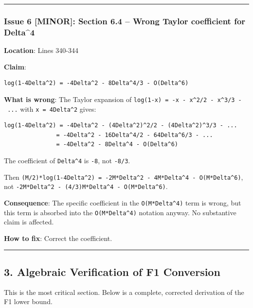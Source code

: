 \documentclass[
  12pt,
]{article}
\begin{document}
\begin{center}\rule{0.5\linewidth}{0.5pt}\end{center}

\subsubsection{Issue 6 {[}MINOR{]}: Section 6.4 -- Wrong Taylor
coefficient for
Delta\^{}4}\label{issue-6-minor-section-6.4-wrong-taylor-coefficient-for-delta4}

\textbf{Location}: Lines 340-344

\textbf{Claim}:

\begin{verbatim}
log(1-4Delta^2) = -4Delta^2 - 8Delta^4/3 - O(Delta^6)
\end{verbatim}

\textbf{What is wrong}: The Taylor expansion of
\texttt{log(1-x)\ =\ -x\ -\ x\^{}2/2\ -\ x\^{}3/3\ -\ ...} with
\texttt{x\ =\ 4Delta\^{}2} gives:

\begin{verbatim}
log(1-4Delta^2) = -4Delta^2 - (4Delta^2)^2/2 - (4Delta^2)^3/3 - ...
               = -4Delta^2 - 16Delta^4/2 - 64Delta^6/3 - ...
               = -4Delta^2 - 8Delta^4 - O(Delta^6)
\end{verbatim}

The coefficient of \texttt{Delta\^{}4} is \texttt{-8}, not
\texttt{-8/3}.

Then
\texttt{(M/2)*log(1-4Delta\^{}2)\ =\ -2M*Delta\^{}2\ -\ 4M*Delta\^{}4\ -\ O(M*Delta\^{}6)},
not \texttt{-2M*Delta\^{}2\ -\ (4/3)M*Delta\^{}4\ -\ O(M*Delta\^{}6)}.

\textbf{Consequence}: The specific coefficient in the
\texttt{O(M*Delta\^{}4)} term is wrong, but this term is absorbed into
the \texttt{O(M*Delta\^{}4)} notation anyway. No substantive claim is
affected.

\textbf{How to fix}: Correct the coefficient.

\begin{center}\rule{0.5\linewidth}{0.5pt}\end{center}

\subsection{3. Algebraic Verification of F1
Conversion}\label{algebraic-verification-of-f1-conversion}

This is the most critical section. Below is a complete, corrected
derivation of the F1 lower bound.
\end{document}
